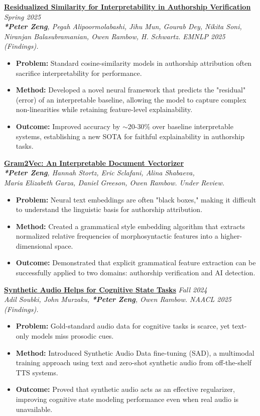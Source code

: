\documentclass[letterpaper,10pt]{article}
\newcommand{\organization}[4]{
    \vspace{-1.0pt}
    \textbf{#1} \hfill{\emph{#2}} \\
    \emph{#3} \hfill{#4} \\
    \vspace{1.5pt} %
}
\newcommand{\bulletsBegin}{
    \vspace{1pt}
    \begin{minipage}{17.6cm} 
    \begin{itemize}[leftmargin=0.6cm]
    \setlength\itemsep{1pt} %
}
\newcommand{\bulletsEnd}{
    \end{itemize}\vspace{1pt}
    \end{minipage}
}
\begin{document}
    \organization{\href{https://aclanthology.org/2025.findings-emnlp.856/}{Residualized Similarity for Interpretability in Authorship Verification}}{Spring 2025}
    {\textbf{*Peter Zeng}, Pegah Alipoormolabashi, Jihu Mun, Gourab Dey, Nikita Soni, \\Niranjan Balasubramanian, Owen Rambow, H. Schwartz. \textit{EMNLP 2025 (Findings)}.}{}
    \bulletsBegin
        \item \textbf{Problem:} Standard cosine-similarity models in authorship attribution often sacrifice interpretability for performance.
        \item \textbf{Method:} Developed a novel neural framework that predicts the "residual" (error) of an interpretable baseline, allowing the model to capture complex non-linearities while retaining feature-level explainability.
        \item \textbf{Outcome:} Improved accuracy by $\sim$20-30\% over baseline interpretable systems, establishing a new SOTA for faithful explainability in authorship tasks.
    \bulletsEnd

    \organization{\href{https://arxiv.org/abs/2406.12131}{Gram2Vec: An Interpretable Document Vectorizer}}{}
        {\textbf{*Peter Zeng}, Hannah Stortz, Eric Sclafani, Alina Shabaeva,\\ Maria Elizabeth Garza, Daniel Greeson, Owen Rambow. \textit{Under Review}.}{}
        \bulletsBegin
            \item \textbf{Problem:} Neural text embeddings are often "black boxes," making it difficult to understand the linguistic basis for authorship attribution.
            \item \textbf{Method:} Created a grammatical style embedding algorithm that extracts normalized relative frequencies of morphosyntactic features into a higher-dimensional space.
            \item \textbf{Outcome:} Demonstrated that explicit grammatical feature extraction can be successfully applied to two domains: authorship verification and AI detection.
        \bulletsEnd
    
    \organization{\href{https://arxiv.org/pdf/2502.06922}{Synthetic Audio Helps for Cognitive State Tasks}}{Fall 2024}
    {Adil Soubki, John Murzaku, \textbf{*Peter Zeng}, Owen Rambow. \textit{NAACL 2025} (Findings).}{}
    \bulletsBegin
        \item \textbf{Problem:} Gold-standard audio data for cognitive tasks is scarce, yet text-only models miss prosodic cues.
        \item \textbf{Method:} Introduced Synthetic Audio Data fine-tuning (SAD), a multimodal training approach using text and zero-shot synthetic audio from off-the-shelf TTS systems.
        \item \textbf{Outcome:} Proved that synthetic audio acts as an effective regularizer, improving cognitive state modeling performance even when real audio is unavailable.
    \bulletsEnd
    
\end{document}
